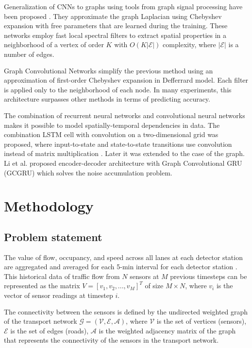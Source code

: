 \documentclass[letterpaper, 10 pt, conference]{ieeeconf}  %
\begin{document}
Generalization of CNNs to graphs using tools from graph signal processing have been proposed \cite{Defferrard2016}. They approximate the graph Laplacian using Chebyshev expansion with free parameters that are learned during the training.  These networks employ fast local spectral filters to extract spatial properties in a neighborhood of a vertex of order $K$ with $O(K|\mathcal{E}|)$ complexity, where $|\mathcal{E}|$ is a number of edges. 

Graph Convolutional Networks \cite{kipf2017semi} simplify the previous method using an approximation of first-order Chebyshev expansion in Defferrard model. Each filter is applied only to the neighborhood of each node. In many experiments, this architecture surpasses other methods in terms of predicting accuracy.

The combination of recurrent neural networks and convolutional neural networks makes it possible to model spatially-temporal dependencies in data. The combination LSTM cell with convolution on a two-dimensional grid was proposed, where input-to-state and state-to-state transitions use convolution instead of matrix multiplication \cite{Shi2015}. Later it was extended \cite{Seo2016} to the case of the graph. Li et al. \cite{Li2017} proposed encoder-decoder architecture with Graph Convolutional GRU (GCGRU) which solves the noise accumulation problem.

\section{Methodology}
\subsection{Problem statement}
The value of flow, occupancy, and speed across all lanes at each detector station are aggregated and averaged for each 5-min interval for each detector station \cite{Chen2001}. This historical data of traffic flow from $N$ sensors at $M$ previous timesteps can be represented as the matrix $V=[v_1,v_2,...,v_M ]^T$ of size $M \times N $,  where $v_i$ is the vector of sensor readings at timestep $i$.

The connectivity between the sensors is defined by the undirected weighted graph of the transport network $\mathcal{G = (V, E, A)}$, where $\mathcal{V}$ is the set of vertices (sensors), $\mathcal{E}$ is the set of edges (roads), $\mathcal{A}$ is the weighted adjacency matrix of the graph that represents the connectivity of the sensors in the transport network.
\end{document}
